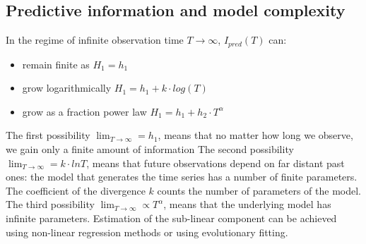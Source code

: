 \subsection{Predictive information and model complexity}
In the regime of infinite observation time $T\rightarrow \infty$, $I_{pred}(T)$ can:
\begin{itemize}
 \item remain finite as $H_1=h_1$
 \item grow logarithmically $H_1=h_1 + k \cdot log(T)$
 \item grow as a fraction power law $H_1=h_1 + h_2 \cdot T^{\alpha}$
\end{itemize}
The first possibility \textbf{$\lim_{T\to\infty}=h_1$}, means that no matter how
 long we observe, we gain only a finite amount of information
The second possibility \textbf{$\lim_{T\to\infty}= k\cdot lnT$}, means that future
 observations depend on far distant past ones: the model that generates the time
 series has a number of finite parameters. The coefficient of the divergence $k$
counts the number of parameters of the model.
The third possibility \textbf{$\lim_{T\to\infty} \propto T^{\alpha}$}, means that
the underlying model has infinite parameters.
Estimation of the sub-linear component can be achieved using non-linear regression
 methods or using evolutionary fitting.

